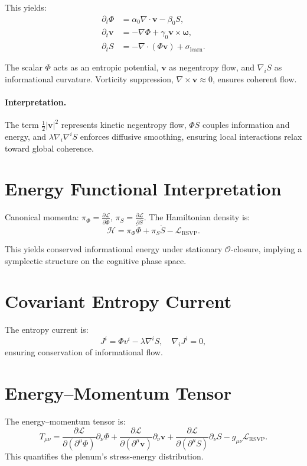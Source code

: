 \documentclass[12pt]{book}
\theoremstyle{definition}
\begin{document}
This yields:
\begin{align}
\partial_t \Phi &= \alpha_0 \nabla \cdot \mathbf{v} - \beta_0 S, \label{eq:phi_eq} \\
\partial_t \mathbf{v} &= -\nabla \Phi + \gamma_0 \mathbf{v} \times \boldsymbol{\omega}, \label{eq:v_eq} \\
\partial_t S &= -\nabla \cdot (\Phi \mathbf{v}) + \sigma_{\text{learn}}. \label{eq:s_eq}
\end{align}

The scalar \(\Phi\) acts as an entropic potential, \(\mathbf{v}\) as negentropy flow, and \(\nabla_i S\) as informational curvature. Vorticity suppression, \(\nabla \times \mathbf{v} \approx 0\), ensures coherent flow.

\paragraph{Interpretation.} The term \(\frac{1}{2}|\mathbf{v}|^2\) represents kinetic negentropy flow, \(\Phi S\) couples information and energy, and \(\lambda \nabla_i \nabla^i S\) enforces diffusive smoothing, ensuring local interactions relax toward global coherence.

\section{Energy Functional Interpretation}
Canonical momenta: \(\pi_\Phi = \frac{\partial \mathcal{L}}{\partial \dot{\Phi}}\), \(\pi_S = \frac{\partial \mathcal{L}}{\partial \dot{S}}\). The Hamiltonian density is:
\begin{equation}
\mathcal{H} = \pi_\Phi \dot{\Phi} + \pi_S \dot{S} - \mathcal{L}_{\text{RSVP}}.
\end{equation}

This yields conserved informational energy under stationary \(\mathcal{O}\)-closure, implying a symplectic structure on the cognitive phase space.

\section{Covariant Entropy Current}
The entropy current is:
\begin{equation}
J^i = \Phi v^i - \lambda \nabla^i S, \quad \nabla_i J^i = 0,
\end{equation}
ensuring conservation of informational flow.

\section{Energy–Momentum Tensor}
The energy–momentum tensor is:
\begin{equation}
T_{\mu\nu} = \frac{\partial \mathcal{L}}{\partial (\partial^\mu \Phi)} \partial_\nu \Phi + \frac{\partial \mathcal{L}}{\partial (\partial^\mu \mathbf{v})} \partial_\nu \mathbf{v} + \frac{\partial \mathcal{L}}{\partial (\partial^\mu S)} \partial_\nu S - g_{\mu\nu} \mathcal{L}_{\text{RSVP}}.
\end{equation}
This quantifies the plenum’s stress-energy distribution.
\end{document}
